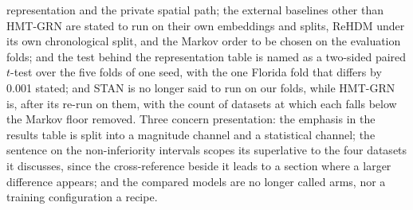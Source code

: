 representation and the private spatial path; the external baselines other than HMT-GRN are stated to run on their
own embeddings and splits, ReHDM under its own chronological split, and the Markov order to be chosen
on the evaluation folds; and the test behind the representation table is named as a two-sided paired
$t$-test over the five folds of one seed, with the one Florida fold that differs by 0.001 stated; and STAN is no longer said to run on our
folds, while HMT-GRN is, after its re-run on them, with the count of datasets at which each falls
below the Markov floor removed. Three
concern presentation: the emphasis in the results table is
split into a magnitude channel and a statistical channel; the sentence on the
non-inferiority intervals scopes its superlative to the four datasets it discusses, since the
cross-reference beside it leads to a section where a larger difference appears; and the compared
models are no longer called arms, nor a training configuration a recipe.

